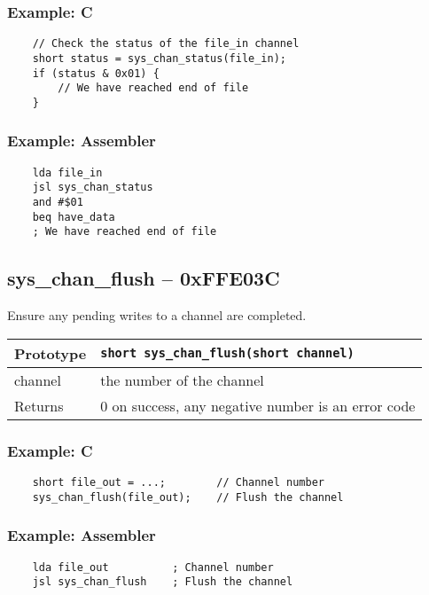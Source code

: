 \subsubsection*{Example: C}
\begin{lstlisting}
    // Check the status of the file_in channel
    short status = sys_chan_status(file_in);
    if (status & 0x01) {
        // We have reached end of file
    }
\end{lstlisting}

\subsubsection*{Example: Assembler}
\begin{verbatim}
    lda file_in
    jsl sys_chan_status
    and #$01
    beq have_data
    ; We have reached end of file
\end{verbatim}

\subsection*{sys\_chan\_flush -- 0xFFE03C}
Ensure any pending writes to a channel are completed.

\bigskip

\begin{tabular}{|l||l|} \hline
Prototype & \lstinline!short sys_chan_flush(short channel)! \\ \hline
channel & the number of the channel \\ \hline
Returns & 0 on success, any negative number is an error code \\ \hline
\end{tabular}

\subsubsection*{Example: C}
\begin{lstlisting}
    short file_out = ...;        // Channel number
    sys_chan_flush(file_out);    // Flush the channel
\end{lstlisting}

\subsubsection*{Example: Assembler}
\begin{verbatim}
    lda file_out          ; Channel number
    jsl sys_chan_flush    ; Flush the channel
\end{verbatim}

